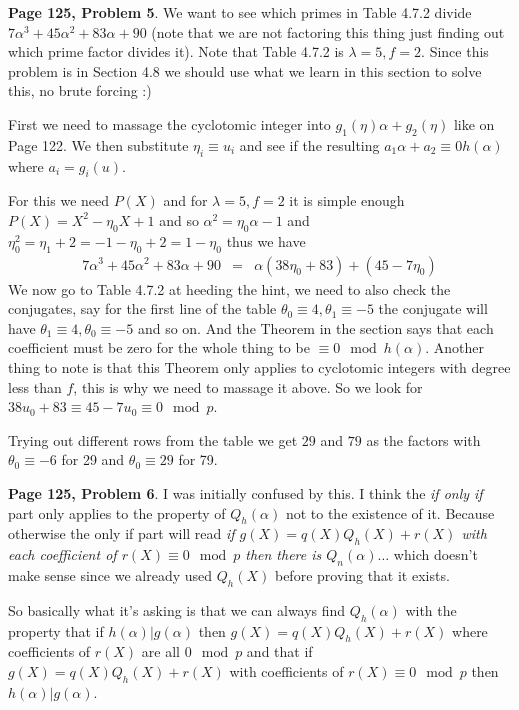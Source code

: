 \documentclass[aps,preprint,preprintnumbers,nofootinbib,showpacs,prd]{revtex4-1}
\newcommand{\nbea}{\begin{eqnarray*}}
\newcommand{\neea}{\end{eqnarray*}}
\begin{document}
{\bf Page 125, Problem 5}. We want to see which primes in Table 4.7.2 divide $7\alpha^3 + 45\alpha^2 + 83\alpha + 90$ (note that we are not factoring this thing just finding out which prime factor divides it). Note that Table 4.7.2 is $\lambda = 5, f = 2$. Since this problem is in Section 4.8 we should use what we learn in this section to solve this, no brute forcing :)

First we need to massage the cyclotomic integer into $g_1(\eta)\alpha + g_2(\eta)$ like on Page 122. We then substitute $\eta_i \equiv u_i$ and see if the resulting $a_1 \alpha + a_2 \equiv 0 h(\alpha)$ where $a_i = g_i(u)$.

For this we need $P(X)$ and for $\lambda = 5, f = 2$ it is simple enough $P(X) = X^2 - \eta_0X + 1$ and so $\alpha^2 = \eta_0\alpha - 1$ and $\eta_0^2 = \eta_1 + 2 = -1 - \eta_0 + 2 = 1 - \eta_0$ thus we have
%
\nbea
7\alpha^3 + 45\alpha^2 + 83\alpha + 90 & = & \alpha(38 \eta_0 + 83) + (45 - 7\eta_0)
\neea
%
We now go to Table 4.7.2 at heeding the hint, we need to also check the conjugates, say for the first line of the table $\theta_0 \equiv 4, \theta_1 \equiv -5$ the conjugate will have $\theta_1 \equiv 4, \theta_0 \equiv -5$ and so on. And the Theorem in the section says that each coefficient must be zero for the whole thing to be $\equiv 0 \mod{h(\alpha)}$. Another thing to note is that this Theorem only applies to cyclotomic integers with degree less than $f$, this is why we need to massage it above. So we look for $38 u_0 + 83 \equiv 45 - 7u_0 \equiv 0 \mod{p}$.

Trying out different rows from the table we get $29$ and $79$ as the factors with $\theta_0 \equiv -6$ for 29 and $\theta_0 \equiv 29$ for 79.

{\bf Page 125, Problem 6}. I was initially confused by this. I think the {\it if only if} part only applies to the property of $Q_h(\alpha)$ not to the existence of it. Because otherwise the only if part will read {\it if $g(X) = q(X)Q_h(X) + r(X)$ with each coefficient of $r(X) \equiv 0\mod{p}$ then there is $Q_n(\alpha) \dots$} which doesn't make sense since we already used $Q_h(X)$ before proving that it exists.

So basically what it's asking is that we can always find $Q_h(\alpha)$ with the property that if $h(\alpha) | g(\alpha)$ then $g(X) = q(X)Q_h(X) + r(X)$ where coefficients of $r(X)$ are all $0 \mod{p}$ and that if $g(X) = q(X)Q_h(X) + r(X)$ with coefficients of $r(X) \equiv 0\mod{p}$ then $h(\alpha)|g(\alpha)$.
\end{document}

